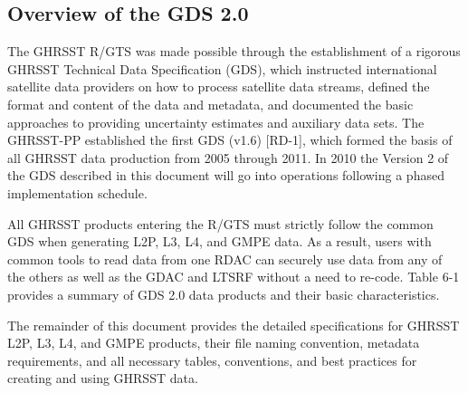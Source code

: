 \subsection{Overview of the GDS 2.0}
The GHRSST R/GTS was made possible through the establishment of a rigorous GHRSST Technical Data Specification (GDS), which instructed international satellite data providers on how to process satellite data streams, defined the format and content of the data and metadata, and documented the basic approaches to providing uncertainty estimates and auxiliary data sets. The GHRSST-PP established the first GDS (v1.6) [RD-1], which formed the basis of all GHRSST data production from 2005 through 2011. In 2010 the Version 2 of the GDS described in this document will go into operations following a phased implementation schedule.
\par\vspace{0.25cm}
All GHRSST products entering the R/GTS must strictly follow the common GDS when generating L2P, L3, L4, and GMPE data. As a result, users with common tools to read data from one RDAC can securely use data from any of the others as well as the GDAC and LTSRF without a need to re-code. Table 6-1 provides a summary of GDS 2.0 data products and their basic characteristics.
\par\vspace{0.25cm}
The remainder of this document provides the detailed specifications for GHRSST L2P, L3, L4, and GMPE products, their file naming convention, metadata requirements, and all necessary tables, conventions, and best practices for creating and using GHRSST data.
\newp